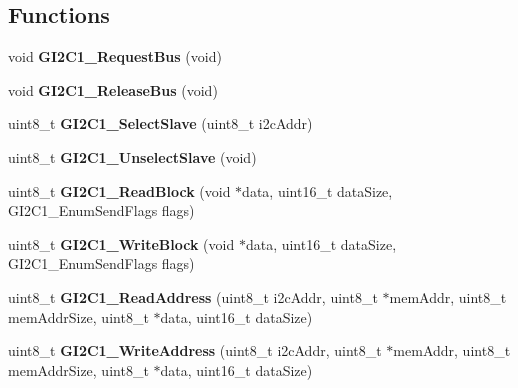 \subsection*{Functions}
\begin{DoxyCompactItemize}
\item 
\hypertarget{group___g_i2_c1__module_ga49fd725c9ab49014dfceb0b56e6e617e}{void {\bfseries G\-I2\-C1\-\_\-\-Request\-Bus} (void)}\label{group___g_i2_c1__module_ga49fd725c9ab49014dfceb0b56e6e617e}

\item 
\hypertarget{group___g_i2_c1__module_ga2d08f79a76f50de43047e4b292947ff6}{void {\bfseries G\-I2\-C1\-\_\-\-Release\-Bus} (void)}\label{group___g_i2_c1__module_ga2d08f79a76f50de43047e4b292947ff6}

\item 
\hypertarget{group___g_i2_c1__module_ga396142ace74fa33b2e8f75c67982defc}{uint8\-\_\-t {\bfseries G\-I2\-C1\-\_\-\-Select\-Slave} (uint8\-\_\-t i2c\-Addr)}\label{group___g_i2_c1__module_ga396142ace74fa33b2e8f75c67982defc}

\item 
\hypertarget{group___g_i2_c1__module_ga98fb70948f30138802b637d560581b37}{uint8\-\_\-t {\bfseries G\-I2\-C1\-\_\-\-Unselect\-Slave} (void)}\label{group___g_i2_c1__module_ga98fb70948f30138802b637d560581b37}

\item 
\hypertarget{group___g_i2_c1__module_gaad5cd2a4aef82e9dadf756c250108e94}{uint8\-\_\-t {\bfseries G\-I2\-C1\-\_\-\-Read\-Block} (void $\ast$data, uint16\-\_\-t data\-Size, G\-I2\-C1\-\_\-\-Enum\-Send\-Flags flags)}\label{group___g_i2_c1__module_gaad5cd2a4aef82e9dadf756c250108e94}

\item 
\hypertarget{group___g_i2_c1__module_ga45790012123e26a0a5d9439bef7eca6e}{uint8\-\_\-t {\bfseries G\-I2\-C1\-\_\-\-Write\-Block} (void $\ast$data, uint16\-\_\-t data\-Size, G\-I2\-C1\-\_\-\-Enum\-Send\-Flags flags)}\label{group___g_i2_c1__module_ga45790012123e26a0a5d9439bef7eca6e}

\item 
\hypertarget{group___g_i2_c1__module_gae84ad1c6bd51ae10712b18a9deb32457}{uint8\-\_\-t {\bfseries G\-I2\-C1\-\_\-\-Read\-Address} (uint8\-\_\-t i2c\-Addr, uint8\-\_\-t $\ast$mem\-Addr, uint8\-\_\-t mem\-Addr\-Size, uint8\-\_\-t $\ast$data, uint16\-\_\-t data\-Size)}\label{group___g_i2_c1__module_gae84ad1c6bd51ae10712b18a9deb32457}

\item 
\hypertarget{group___g_i2_c1__module_ga83d9e896cefaa71661649c34e69351e2}{uint8\-\_\-t {\bfseries G\-I2\-C1\-\_\-\-Write\-Address} (uint8\-\_\-t i2c\-Addr, uint8\-\_\-t $\ast$mem\-Addr, uint8\-\_\-t mem\-Addr\-Size, uint8\-\_\-t $\ast$data, uint16\-\_\-t data\-Size)}\label{group___g_i2_c1__module_ga83d9e896cefaa71661649c34e69351e2}


\end{DoxyCompactItemize}
